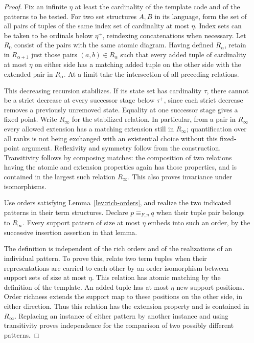 \begin{proof}
Fix an infinite $\eta$ at least the cardinality of the template code
and of the patterns to be tested.  For two set structures $A,B$ in
its language, form the set of all pairs of tuples of the same index
set of cardinality at most $\eta$.  Index sets can be taken to be
ordinals below $\eta^+$, reindexing concatenations when necessary.
Let $R_0$ consist of the pairs with the same atomic diagram.  Having
defined $R_\alpha$, retain in $R_{\alpha+1}$ just those pairs
$(a,b)\in R_\alpha$ such that every added tuple of cardinality at
most $\eta$ on either side has a matching added tuple on the other
side with the extended pair in $R_\alpha$.  At a limit take the
intersection of all preceding relations.

This decreasing recursion stabilizes.  If its state set has
cardinality $\tau$, there cannot be a strict decrease at every
successor stage below $\tau^+$, since each strict decrease removes
a previously unremoved state.  Equality at one successor stage
gives a fixed point.  Write $R_\infty$ for the stabilized relation.
In particular, from a pair in $R_\infty$ every allowed extension has
a matching extension still in $R_\infty$; quantification over all
ranks is not being exchanged with an existential choice without
this fixed-point argument.  Reflexivity and symmetry follow from
the construction.  Transitivity follows by composing matches:
the composition of two relations having the atomic and extension
properties again has those properties, and is contained in the
largest such relation $R_\infty$.  This also proves invariance under
isomorphisms.

Use orders satisfying Lemma~\ref{lev:rich-orders}, and realize the
two indicated patterns in their term structures.  Declare
$p\equiv_{F,\eta}q$ when their tuple pair belongs to $R_\infty$.
Every support pattern of size at most $\eta$ embeds into such an
order, by the successive insertion assertion in that lemma.

The definition is independent of the rich orders and of the
realizations of an individual pattern.  To prove this, relate two
term tuples when their representations are carried to each other
by an order isomorphism between support sets of size at most $\eta$.
This relation has atomic matching by the definition of the template.
An added tuple has at most $\eta$ new support positions.  Order
richness extends the support map to these positions on the other
side, in either direction.  Thus this relation has the extension
property and is contained in $R_\infty$.  Replacing an instance of
either pattern by another instance and using transitivity proves
independence for the comparison of two possibly different patterns.


\end{proof}
